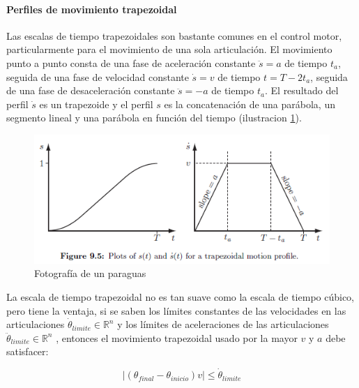         \newpage

             
        \paragraph{Perfiles de movimiento trapezoidal}\label{Perfiles_de_movimiento_trapezoidal}
        
        Las escalas de tiempo trapezoidales son bastante comunes en el control motor, particularmente para el movimiento de una sola articulación. El movimiento punto a punto consta de una fase de aceleración constante $\ddot{s}=a$ de tiempo $t_a$, seguida de una fase de velocidad constante $\dot{s}=v$ de tiempo $t = T-2t_a$, seguida de una fase de desaceleración constante $\ddot{s}=-a$ de tiempo $t_a$. El resultado del perfil $\dot{s}$ es un trapezoide y el perfil $s$ es la concatenación de una parábola, un segmento lineal y una parábola en función del tiempo (ilustracion \ref{f:Cap4_tray_9}).

            \begin{figure}[htb]
                \centering
                \includegraphics[width=0.7\linewidth]{Main/Chapter4/Images4/cap4_tray_9.png}
                \caption{Fotografía de un paraguas}
                \label{f:Cap4_tray_9}
            \end{figure}  
    
        La escala de tiempo trapezoidal no es tan suave como la escala de tiempo cúbico, pero tiene la ventaja, si se saben los límites constantes de las velocidades en las articulaciones  ${\dot{\theta}}_{limite} \in {\mathbb{R}}^n $   y los límites de aceleraciones de las articulaciones ${\ddot{\theta}}_{limite} \in {\mathbb{R}}^n $  , entonces el movimiento trapezoidal usado por la mayor $v$ y $a$  debe satisfacer:
        
        \begin{equation}
             \left| ({\theta}_{final}-{\theta}_{inicio})v \right|   \leq {\dot{\theta}}_{limite}
            \label{eq:cap4_tray_28}
        \end{equation}
        
